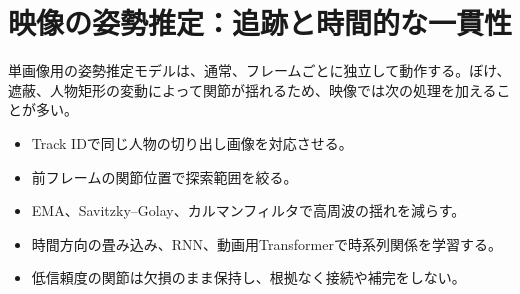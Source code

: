 \documentclass[11pt,a4paper,oneside]{report}
\begin{document}
\section{映像の姿勢推定：追跡と時間的な一貫性}

単画像用の姿勢推定モデルは、通常、フレームごとに独立して動作する。ぼけ、遮蔽、人物矩形の変動によって関節が揺れるため、映像では次の処理を加えることが多い。
\begin{itemize}
  \item Track IDで同じ人物の切り出し画像を対応させる。
  \item 前フレームの関節位置で探索範囲を絞る。
  \item EMA、Savitzky--Golay、カルマンフィルタで高周波の揺れを減らす。
  \item 時間方向の畳み込み、RNN、動画用Transformerで時系列関係を学習する。
  \item 低信頼度の関節は欠損のまま保持し、根拠なく接続や補完をしない。
\end{itemize}
\end{document}
